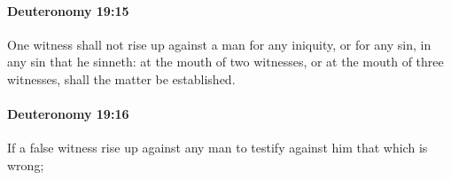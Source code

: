 		\paragraph{Deuteronomy 19:15} %
			\label{DEUTERONOMY-19-15}

			One witness shall not rise up against a man for any iniquity, or for any sin, in any sin that he sinneth: at the mouth of two witnesses, or at the mouth of three witnesses, shall the matter be established.


		\paragraph{Deuteronomy 19:16} %
			\label{DEUTERONOMY-19-16}

			If a false witness rise up against any man to testify against him that which is wrong;



